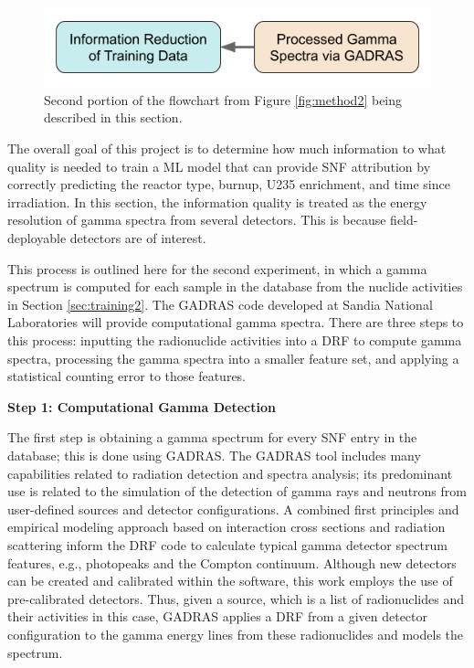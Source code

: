 
\begin{figure}[H]
  \centering
  \includegraphics[width=0.7\linewidth]{./chapters/exp2/methodology2_2.png}
  \caption[Second portion of the flowchart from Figure \ref{fig:method2}]
          {Second portion of the flowchart from Figure \ref{fig:method2} being 
           described in this section.}
\end{figure}

The overall goal of this project is to determine how much information to what
quality is needed to train a  \gls{ML} model that can provide \gls{SNF}
attribution by correctly predicting the reactor type, burnup, \gls{U235}
enrichment, and time since irradiation.  In this section, the information
quality is treated as the energy resolution of gamma spectra from several
detectors.  This is because field-deployable detectors are of interest.

This process is outlined here for the second experiment, in which a gamma
spectrum is computed for each sample in the database from the nuclide
activities in Section \ref{sec:training2}.  The \gls{GADRAS} code \cite{gadras}
developed at Sandia National Laboratories will provide computational gamma
spectra. There are three steps to this process: inputting the radionuclide
activities into a \gls{DRF} to compute gamma spectra, processing the gamma
spectra into a smaller feature set, and applying a statistical counting error
to those features.

\noindent \textbf{Step 1: Computational Gamma Detection}

The first step is obtaining a gamma spectrum for every \gls{SNF} entry in the
database; this is done using \gls{GADRAS}. The \gls{GADRAS} tool includes many
capabilities related to radiation detection and spectra analysis; its
predominant use is related to the simulation of the detection of gamma rays and
neutrons from user-defined sources and detector configurations.  A combined
first principles and empirical modeling approach based on interaction cross
sections and radiation scattering inform the \gls{DRF} code to calculate
typical gamma detector spectrum features, e.g., photopeaks and the Compton
continuum.  Although new detectors can be created and calibrated within the
software, this work employs the use of pre-calibrated detectors.  Thus, given a
source, which is a list of radionuclides and their activities in this case,
\gls{GADRAS} applies a \gls{DRF} from a given detector configuration to the
gamma energy lines from these radionuclides and models the spectrum.
\cite{gadras} 

